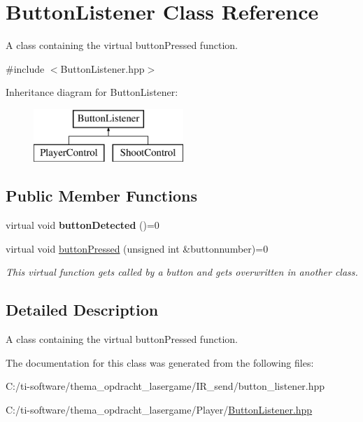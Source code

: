 \hypertarget{class_button_listener}{}\section{Button\+Listener Class Reference}
\label{class_button_listener}


A class containing the virtual button\+Pressed function.  




{\ttfamily \#include $<$Button\+Listener.\+hpp$>$}

Inheritance diagram for Button\+Listener\+:\begin{figure}[H]
\begin{center}
\leavevmode
\includegraphics[height=2.000000cm]{class_button_listener}
\end{center}
\end{figure}
\subsection*{Public Member Functions}
\begin{DoxyCompactItemize}
\item 
\mbox{\label{class_button_listener_a444f84514e359443020463edc129cd12}} 
virtual void {\bfseries button\+Detected} ()=0
\item 
\mbox{\label{class_button_listener_a669be11c0665a02e9501ee4ca03d8a8d}} 
virtual void \mbox{\hyperlink{class_button_listener_a669be11c0665a02e9501ee4ca03d8a8d}{button\+Pressed}} (unsigned int \&buttonnumber)=0
\begin{DoxyCompactList}\small\item\em This virtual function gets called by a button and gets overwritten in another class. \end{DoxyCompactList}\end{DoxyCompactItemize}


\subsection{Detailed Description}
A class containing the virtual button\+Pressed function. 

The documentation for this class was generated from the following files\+:\begin{DoxyCompactItemize}
\item 
C\+:/ti-\/software/thema\+\_\+opdracht\+\_\+lasergame/\+I\+R\+\_\+send/button\+\_\+listener.\+hpp\item 
C\+:/ti-\/software/thema\+\_\+opdracht\+\_\+lasergame/\+Player/\mbox{\hyperlink{_button_listener_8hpp}{Button\+Listener.\+hpp}}\end{DoxyCompactItemize}
